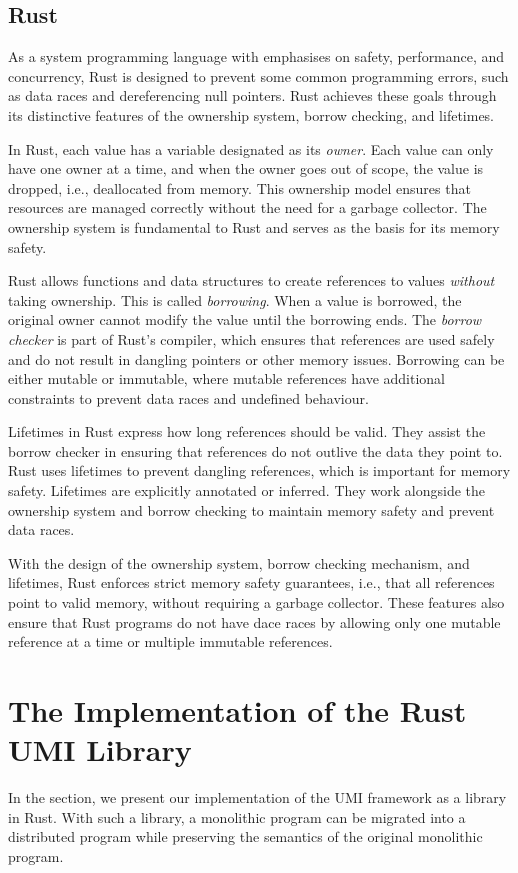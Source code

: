 \subsection{Rust}
\label{chap3:background:rust}
As a system programming language with emphasises on safety, performance, and concurrency, Rust is designed to prevent some common programming errors, such as data races and dereferencing null pointers. Rust achieves these goals through its distinctive features of the ownership system, borrow checking, and lifetimes.

In Rust, each value has a variable designated as its \emph{owner}. Each value can only have one owner at a time, and when the owner goes out of scope, the value is dropped, i.e., deallocated from memory. This ownership model ensures that resources are managed correctly without the need for a garbage collector. The ownership system is fundamental to Rust and serves as the basis for its memory safety.

Rust allows functions and data structures to create references to values \emph{without} taking ownership. This is called \emph{borrowing}. When a value is borrowed, the original owner cannot modify the value until the borrowing ends. The \emph{borrow checker} is part of Rust's compiler, which ensures that references are used safely and do not result in dangling pointers or other memory issues. Borrowing can be either mutable or immutable, where mutable references have additional constraints to prevent data races and undefined behaviour.

Lifetimes in Rust express how long references should be valid. They assist the borrow checker in ensuring that references do not outlive the data they point to. Rust uses lifetimes to prevent dangling references, which is important for memory safety. Lifetimes are explicitly annotated or inferred. They work alongside the ownership system and borrow checking to maintain memory safety and prevent data races.

With the design of the ownership system, borrow checking mechanism, and lifetimes, Rust enforces strict memory safety guarantees, i.e., that all references point to valid memory, without requiring a garbage collector. These features also ensure that Rust programs do not have dace races by allowing only one mutable reference at a time or multiple immutable references.

\section{The Implementation of the Rust UMI Library}
\label{chap3:implementation}
In the section, we present our implementation of the UMI framework as a library in Rust. With such a library, a monolithic program can be migrated into a distributed program while preserving the semantics of the original monolithic program.

